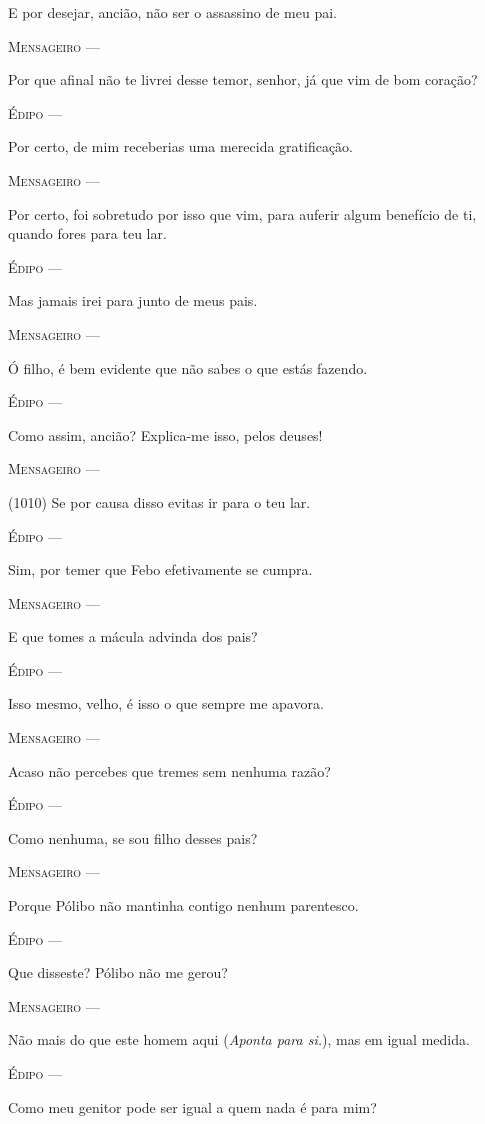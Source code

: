 E por desejar, ancião, não ser o assassino de meu pai.

\textsc{Mensageiro} ---

Por que afinal não te livrei desse temor, senhor, já que vim de bom
coração?

\textsc{Édipo} ---

Por certo, de mim receberias uma merecida gratificação.

\textsc{Mensageiro} ---

Por certo, foi sobretudo por isso que vim, para auferir algum benefício
de ti, quando fores para teu lar.

\textsc{Édipo} ---

Mas jamais irei para junto de meus pais.

\textsc{Mensageiro} ---

Ó filho, é bem evidente que não sabes o que estás fazendo.

\textsc{Édipo} ---

Como assim, ancião? Explica-me isso, pelos deuses!

\textsc{Mensageiro} ---

(1010) Se por causa disso evitas ir para o teu lar.

\textsc{Édipo} ---

Sim, por temer que Febo efetivamente se cumpra.

\textsc{Mensageiro} ---

E que tomes a mácula advinda dos pais?

\textsc{Édipo} ---

Isso mesmo, velho, é isso o que sempre me apavora.

\textsc{Mensageiro} ---

Acaso não percebes que tremes sem nenhuma razão?

\textsc{Édipo} ---

Como nenhuma, se sou filho desses pais?

\textsc{Mensageiro} ---

Porque Pólibo não mantinha contigo nenhum parentesco.

\textsc{Édipo} ---

Que disseste? Pólibo não me gerou?

\textsc{Mensageiro} ---

Não mais do que este homem aqui (\emph{Aponta para si.}), mas em igual
medida.

\textsc{Édipo} ---

Como meu genitor pode ser igual a quem nada é para mim?

